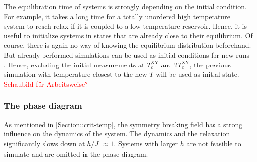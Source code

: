 	The equilibration time of systems is strongly depending on the initial condition. For example, it takes a long time for a totally unordered high temperature system to reach relax if it is coupled to a low temperature reservoir. Hence, it is useful to initialize systems in states that are already close to their equilibrium. Of course, there is again no way of knowing the equilibrium distribution beforehand. But already performed simulations can be used as initial conditions for new runs . Hence, excluding the initial measurements at $T_c^{\text{XY}}$ and $2T_c^{\text{XY}}$, the previous simulation with temperature closest to the new $T$ will be used as initial state. \textcolor{red}{Schaubild für Arbeitsweise?}
	\subsubsection{The phase diagram}
	As mentioned in \autoref{Section::crit-temp}, the symmetry breaking field has a strong influence on the dynamics of the system. The dynamics and the relaxation significantly slows down at $ h / J_\parallel \approx 1$. Systems with larger $h$ are not feasible to simulate and are omitted in the phase diagram. \\
	
